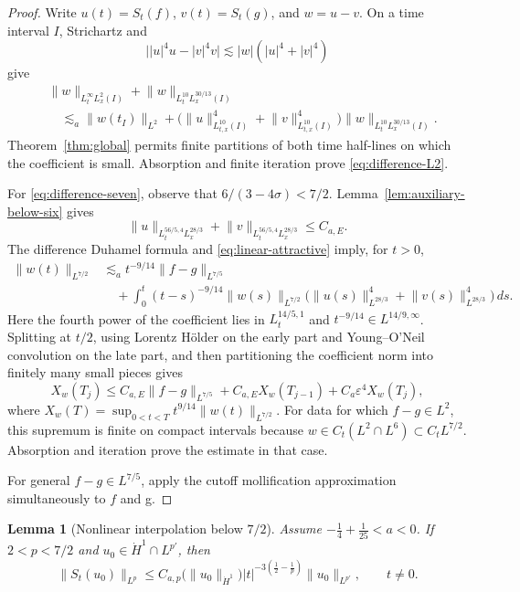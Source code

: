 \documentclass[preprint,12pt]{elsarticle}
\numberwithin{equation}{section}
\newtheorem{lemma}{Lemma}[section]
\theoremstyle{definition}
\theoremstyle{remark}
\newcommand{\norm}[2]{\lVert #1\rVert_{#2}}
\newcommand{\eps}{\varepsilon}
\begin{document}
\begin{proof}
Write $u(t)=S_t(f)$, $v(t)=S_t(g)$, and $w=u-v$.  On a time interval $I$,
Strichartz and
\[
 \bigl||u|^4u-|v|^4v\bigr|
 \lesssim |w|(|u|^4+|v|^4)
\]
give
\[
 \begin{split}
 &\norm{w}{L_t^\infty L_x^2(I)}
 +\norm{w}{L_t^{10}L_x^{30/13}(I)}\\
 &\quad\lesssim_a \norm{w(t_I)}{L^2}
 +\bigl(\norm{u}{L_{t,x}^{10}(I)}^4+
         \norm{v}{L_{t,x}^{10}(I)}^4\bigr)
   \norm{w}{L_t^{10}L_x^{30/13}(I)}.
 \end{split}
\]
Theorem~\ref{thm:global} permits finite partitions of both time
half-lines on which the coefficient is small.  Absorption and finite
iteration prove \eqref{eq:difference-L2}.

For \eqref{eq:difference-seven}, observe that
$6/(3-4\sigma)<7/2$.  Lemma~\ref{lem:auxiliary-below-six} gives
\[
 \norm{u}{L_t^{56/5,4}L_x^{28/3}}
 +\norm{v}{L_t^{56/5,4}L_x^{28/3}}\leq C_{a,E}.
\]
The difference Duhamel formula and
\eqref{eq:linear-attractive} imply, for $t>0$,
\[
 \begin{split}
 \norm{w(t)}{L^{7/2}}
 &\lesssim_a t^{-9/14}\norm{f-g}{L^{7/5}}\\
 &\quad+\int_0^t(t-s)^{-9/14}\norm{w(s)}{L^{7/2}}
 \bigl(\norm{u(s)}{L^{28/3}}^4+
       \norm{v(s)}{L^{28/3}}^4\bigr)\,ds.
 \end{split}
\]
Here the fourth power of the coefficient lies in
$L_t^{14/5,1}$ and $t^{-9/14}\in L^{14/9,\infty}$.
Splitting at $t/2$, using Lorentz H\"older on the early part and
Young--O'Neil convolution on the late part, and then partitioning the
coefficient norm into finitely many small pieces gives
\[
 X_w(T_j)\leq C_{a,E}\norm{f-g}{L^{7/5}}
 +C_{a,E}X_w(T_{j-1})+C_a\eps^4X_w(T_j),
\]
where $X_w(T)=\sup_{0<t<T}t^{9/14}\norm{w(t)}{L^{7/2}}$.
For data for which $f-g\in L^2$, this supremum is finite on compact
intervals because $w\in C_t(L^2\cap L^6)\subset C_tL^{7/2}$.
Absorption and iteration prove the estimate in that case.

For general $f-g\in L^{7/5}$, apply the cutoff mollification approximation simultaneously to \(f\) and g.
\end{proof}

\begin{lemma}[Nonlinear interpolation below $7/2$]
\label{lem:nonlinear-interpolation}
Assume $-\frac14+\frac1{25}<a<0$.  If $2<p<7/2$ and
$u_0\in\dot H^1\cap L^{p'}$, then
\[
 \norm{S_t(u_0)}{L^p}
 \leq C_{a,p}\bigl(\norm{u_0}{\dot H^1}\bigr)
 |t|^{-3(\frac12-\frac1p)}\norm{u_0}{L^{p'}},
 \qquad t\neq0.
\]
\end{lemma}
\end{document}
